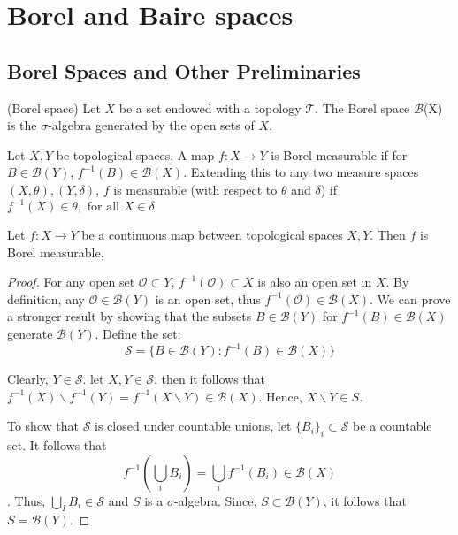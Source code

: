 \documentclass[main.tex]{subfiles}
\begin{document}
 \section{Borel and Baire spaces}

\subsection{Borel Spaces and Other Preliminaries}

\begin{definition}(Borel space)
Let $X$ be a set endowed with a topology $\mathcal{T}$. The Borel space $\mathcal{B}$(X) is the $\sigma$-algebra generated by the open sets of $X$.
\end{definition}

\begin{definition}
Let $X,Y$ be topological spaces. A map $f: X \rightarrow Y$ is Borel measurable if for $B \in \mathcal{B}(Y)$, $f^{-1}(B) \in \mathcal{B}(X)$. Extending this to any two measure spaces $(X,\theta),(Y,\delta)$, $f$ is measurable (with respect to $\theta$ and $\delta$) if $f^{-1}(X) \in \theta, \text{ for all } X \in \delta $
\end{definition}

\begin{lemma}
Let $f: X \rightarrow Y$ be a continuous map between topological spaces $X,Y$. Then $f$ is Borel measurable,
\end{lemma}

\begin{proof}
 For any open set $\mathcal{O} \subset Y$, $f^{-1}(\mathcal{O}) \subset X$ is also an open set in $X$. By definition, any $\mathcal{O} \in \mathcal{B}(Y)$ is an open set, thus  $f^{-1}(\mathcal{O}) \in \mathcal{B}(X)$. We can prove a stronger result by showing that the subsets $B \in \mathcal{B}(Y)$ for $f^{-1}(B) \in \mathcal{B}(X)$ generate $\mathcal{B}(Y)$. Define the set:
 $$\mathcal{S} = \{ B \in \mathcal{B}(Y) : f^{-1}(B) \in \mathcal{B}(X) \} $$
 
Clearly, $Y \in \mathcal{S}$. let $X,Y \in \mathcal{S}$. then it follows that 
$f^{-1}(X) \backslash  f^{-1}(Y) = f^{-1}(X \backslash Y) \in \mathcal{B}(X)$. Hence, $X \backslash Y \in S$.

To show that $\mathcal{S}$ is closed under countable unions, let $\{B_i\}_i \subset \mathcal{S}$ be a countable set. It follows that \
$$ f^{-1}(\bigcup_i B_i) = \bigcup_i f^{-1}(B_i) \in \mathcal{B}(X) $$. Thus, 
$ \bigcup_I B_i \in \mathcal{S}$ and $S$ is a $\sigma$-algebra. Since, $S \subset \mathcal{B}(Y)$, it follows that $S = \mathcal{B}(Y)$.
\end{proof}
\end{document}
